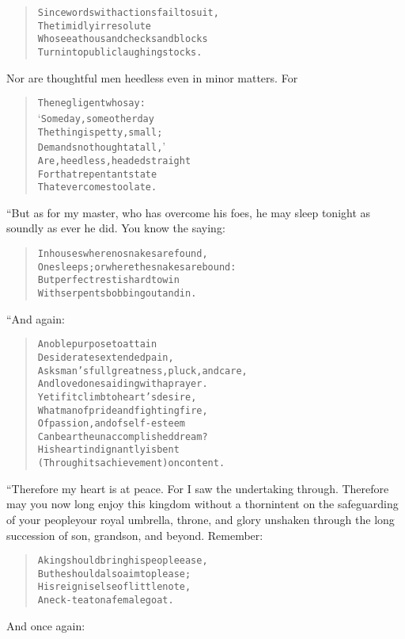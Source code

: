 \documentclass[article, twoside, 10pt]{memoir}
\renewenvironment{verbatim}{%
\begin{quote}%
\vskip -10pt%
\begin{alltt}\normalfont\small}{\end{alltt}%
\end{quote}%
\vskip -10pt
} %
\begin{document}
\begin{verbatim}
Since words with actions fail to suit,
The timidly irresolute
Who see a thousand checks and blocks
Turn into public laughingstocks.
\end{verbatim}
Nor are thoughtful men heedless even in minor matters. For

\begin{verbatim}
The negligent who say:
‘Some day, some other day{\textemdash}
The thing is petty, small;
Demands no thought at all,’
Are, heedless, headed straight
For that repentant state
That ever comes too late.
\end{verbatim}
“But as for my master, who has overcome his foes, he may sleep
tonight as soundly as ever he did. You know the saying:

\begin{verbatim}
In houses where no snakes are found,
One sleeps; or where the snakes are bound:
But perfect rest is hard to win
With serpents bobbing out and in.
\end{verbatim}
“And again:

\begin{verbatim}
A noble purpose to attain
Desiderates extended pain,
Asks man's full greatness, pluck, and care,
And loved ones aiding with a prayer.
Yet if it climb to heart's desire,
What man of pride and fighting fire,
Of passion, and of self-esteem
Can bear the unaccomplished dream?
His heart indignantly is bent
(Through its achievement) on content.
\end{verbatim}
“Therefore my heart is at peace. For I saw the undertaking through.
Therefore may you now long enjoy this kingdom without a
thorn{\textemdash}intent on the safeguarding of your people{\textemdash}your royal
umbrella, throne, and glory unshaken through the long succession of
son, grandson, and beyond. Remember:

\begin{verbatim}
A king should bring his people ease,
But he should also aim to please;
His reign is else of little note,
A neck-teat on a female goat.
\end{verbatim}
And once again:
\end{document}
